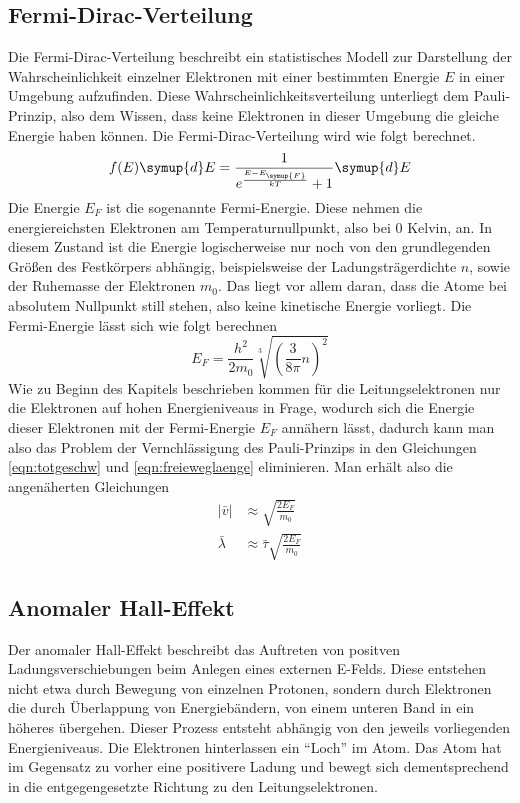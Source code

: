 \subsection{Fermi-Dirac-Verteilung}
\label{sec:fermidirac}
Die Fermi-Dirac-Verteilung beschreibt ein statistisches Modell zur Darstellung der Wahrscheinlichkeit einzelner Elektronen mit einer bestimmten Energie $E$
in einer Umgebung aufzufinden. Diese Wahrscheinlichkeitsverteilung unterliegt dem Pauli-Prinzip, also dem Wissen, dass keine Elektronen in dieser Umgebung die gleiche Energie haben können.
Die Fermi-Dirac-Verteilung wird wie folgt berechnet.
\begin{equation}
\label{eqn:fermidiraceq}
f(E)\symup{d}E = \frac{1}{e^{\frac{E-E_{\symup{F}}}{kT}}+1} \symup{d}E
\end{equation}
Die Energie $E_{F}$ ist die sogenannte Fermi-Energie. Diese nehmen die energiereichsten Elektronen am Temperaturnullpunkt, also bei 0 Kelvin, an. 
In diesem Zustand ist die Energie logischerweise nur noch von den grundlegenden Größen des Festkörpers abhängig, beispielsweise der Ladungsträgerdichte $n$, sowie der Ruhemasse der Elektronen $m_{0}$.
Das liegt vor allem daran, dass die Atome bei absolutem Nullpunkt still stehen, also keine kinetische Energie vorliegt.
Die Fermi-Energie lässt sich wie folgt berechnen
\begin{equation}
\label{eqn:fermienergie}
E_{F} = \frac{h^{2}}{2 m_{0}} \sqrt[3]{\left( \frac{3}{8\pi} n \right)^{2}}
\end{equation}
Wie zu Beginn des Kapitels beschrieben kommen für die Leitungselektronen nur die Elektronen auf hohen Energieniveaus in Frage, wodurch sich die Energie dieser Elektronen
mit der Fermi-Energie $E_{F}$ annähern lässt, dadurch kann man also das Problem der Vernchlässigung des Pauli-Prinzips in den Gleichungen \eqref{eqn:totgeschw} und \eqref{eqn:freieweglaenge} eliminieren.
Man erhält also die angenäherten Gleichungen
\begin{align}
\lvert \bar{v} \rvert &\approx \sqrt{\frac{2 E_{F}}{m_{0}}} \\
\bar{\lambda} &\approx \bar{\tau} \sqrt{\frac{2 E_{F}}{m_{0}}}
\end{align}

\subsection{Anomaler Hall-Effekt}
\label{sec:anomhall}
Der anomaler Hall-Effekt beschreibt das Auftreten von positven Ladungsverschiebungen beim Anlegen eines externen E-Felds. Diese entstehen nicht etwa durch Bewegung von einzelnen Protonen, sondern durch Elektronen
die durch Überlappung von Energiebändern, von einem unteren Band in ein höheres übergehen. Dieser Prozess entsteht abhängig von den jeweils vorliegenden Energieniveaus.
Die Elektronen hinterlassen ein \enquote{Loch} im Atom. Das Atom hat im Gegensatz zu vorher eine positivere Ladung und bewegt sich dementsprechend in die entgegengesetzte Richtung zu den Leitungselektronen.